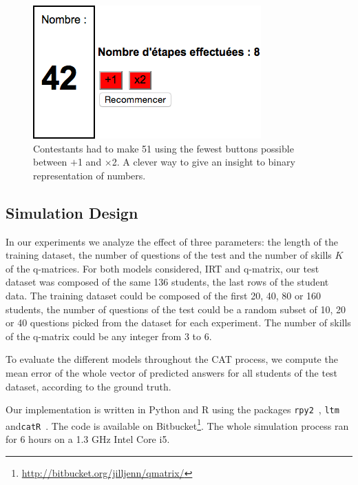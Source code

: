 \documentclass{sig-alternate}
\begin{document}
\begin{figure}
\includegraphics[width=\linewidth]{51-calc}
\caption{Contestants had to make 51 using the fewest buttons possible between $+$1 and $\times$2. A clever way to give an insight to binary representation of numbers.}
\end{figure}

\subsection{Simulation Design}

In our experiments we analyze the effect of three parameters: the length of the training dataset, the number of questions of the test and the number of skills $K$ of the q-matrices. For both models considered, IRT and q-matrix, our test dataset was composed of the same 136 students, the last rows of the student data. The training dataset could be composed of the first 20, 40, 80 or 160 students, the number of questions of the test could be a random subset of 10, 20 or 40 questions picked from the dataset for each experiment. The number of skills of the q-matrix could be any integer from 3 to 6.

To evaluate the different models throughout the CAT process, we compute the mean error of the whole vector of predicted answers for all students of the test dataset, according to the ground truth.

Our implementation is written in Python and R using the packages \texttt{rpy2}~\citep{Gautier2008}, \texttt{ltm}~\citep{Rizopoulos2006} and\linebreak \texttt{catR}~\citep{MagisRaiche2012}. The code is available on Bitbucket\footnote{\url{http://bitbucket.org/jilljenn/qmatrix/}}. The whole simulation process ran for 6 hours on a 1.3 GHz Intel Core i5.
\end{document}
